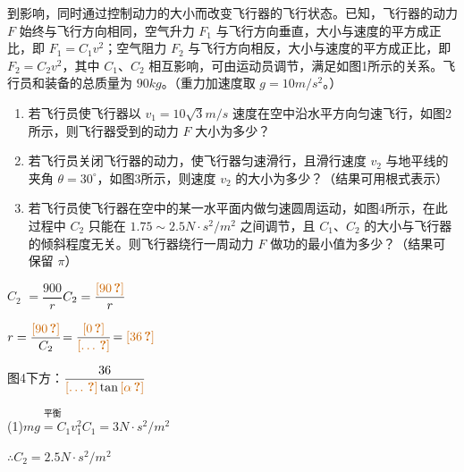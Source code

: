\begin{problem}
到影响，同时通过控制动力的大小而改变飞行器的飞行状态。已知，飞行器的动力 $F$ 始终与飞行方向相同，空气升力 $F_1$ 与飞行方向垂直，大小与速度的平方成正比，即 $F_1=C_1v^2$；空气阻力 $F_2$ 与飞行方向相反，大小与速度的平方成正比，即 $F_2=C_2v^2$，其中 $C_1$、$C_2$ 相互影响，可由运动员调节，满足如图1所示的关系。飞行员和装备的总质量为 $90\unit{kg}$。（重力加速度取 $g=10\unit{m/s^2}$。）
\begin{enumerate}[label=（\arabic*）]
\item 若飞行员使飞行器以 $v_1=10\sqrt{3}\unit{m/s}$ 速度在空中沿水平方向匀速飞行，如图2所示，则飞行器受到的动力 $F$ 大小为多少？
\item 若飞行员关闭飞行器的动力，使飞行器匀速滑行，且滑行速度 $v_2$ 与地平线的夹角 $\theta=30^\circ$，如图3所示，则速度 $v_2$ 的大小为多少？（结果可用根式表示）
\item 若飞行员使飞行器在空中的某一水平面内做匀速圆周运动，如图4所示，在此过程中 $C_2$ 只能在 $1.75\sim2.5\unit{N\cdot s^2/m^2}$ 之间调节，且 $C_1$、$C_2$ 的大小与飞行器的倾斜程度无关。则飞行器绕行一周动力 $F$ 做功的最小值为多少？（结果可保留 $\pi$）
\end{enumerate}
\quad{} %
\par $C_2$\,$\,=\dfrac{900}{r}$\quad{}\quad $C_2=\dfrac{\unclear{90}}{r}$
\par $r=\dfrac{\unclear{90}}{C_2}$\quad $=\dfrac{\unclear{0}}{\unclear{\ldots}}$\quad $=\unclear{36}$
\par 图4下方：$\dfrac{36}{\unclear{\ldots}\tan\unclear{\alpha}}$
\begin{solution}
(1)\quad $\overset{\text{平衡}}{mg=C_1v_1^2}$\quad $C_1=3\unit{N\cdot s^2/m^2}$
\par $\therefore C_2=2.5\unit{N\cdot s^2/m^2}$

\end{solution}
\end{problem}
